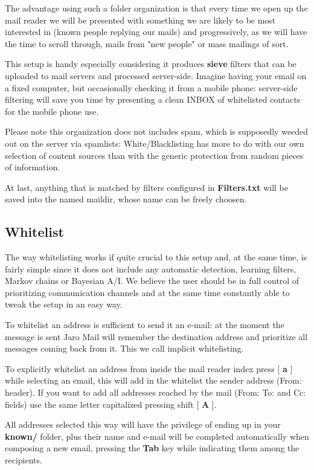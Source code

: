 \documentclass[a4,onecolumn,portrait]{article}
\begin{document}
The advantage using such a folder organization is that every time we open up the mail reader we will be presented with something we are likely to be most interested in (known people replying our mails) and progressively, as we will have the time to scroll through, mails from "new people" or mass mailings of sort.

This setup is handy especially considering it produces \textbf{sieve} filters that can be uploaded to mail servers and processed server-side. Imagine having your email on a fixed computer, but occasionally checking it from a mobile phone: server-side filtering will save you time by presenting a clean INBOX of whitelisted contacts for the mobile phone use.

Please note this organization does not includes spam, which is supposedly weeded out on the server via spamlists: White/Blacklisting has more to do with our own selection of content sources than with the generic protection from random pieces of information.

At last, anything that is matched by filters configured in \textbf{Filters.txt} will be saved into the named maildir, whose name can be freely choosen.

\subsection{Whitelist}
\label{sec-5-2}

The way whitelisting works if quite crucial to this setup and, at the
same time, is fairly simple since it does not include any automatic
detection, learning filters, Markov chains or Bayesian A/I. We believe
the user should be in full control of prioritizing communication
channels and at the same time constantly able to tweak the setup in an
easy way.

To whitelist an address is sufficient to send it an e-mail: at the
moment the message is sent Jaro Mail will remember the destination
address and prioritize all messages coming back from it.
This we call implicit whitelisting.

To explicitly whitelist an address from inside the mail reader index
press [ \textbf{a} ] while selecting an email, this will add in the whitelist
the sender address (From: header). If you want to add all addresses
reached by the mail (From: To: and Cc: fields) use the same letter
capitalized pressing shift [ \textbf{A} ].

All addresses selected this way will have the privilege of ending up
in your \textbf{known/} folder, plus their name and e-mail will be completed
automatically when composing a new email, pressing the \textbf{Tab} key while
indicating them among the recipients.
\end{document}
